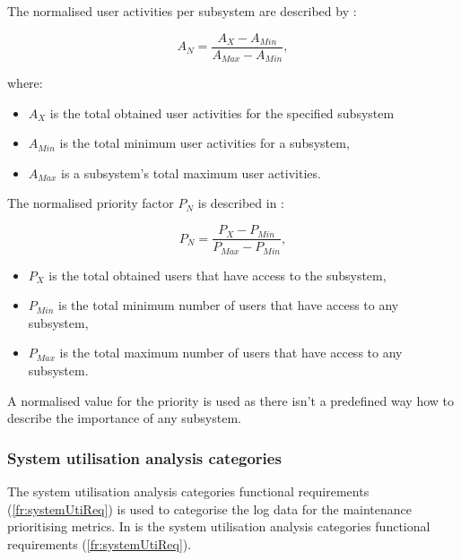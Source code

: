The normalised user activities per subsystem are described by :

\begin{equation}
	\label{eq:ch2_eventNormalised}
	A_{N} = \frac{A_X - A_{Min}}{A_{Max} - A_{Min}},
\end{equation}

where:

\begin{itemize}
	\item $A_X$ is the total obtained user activities for the specified subsystem
	\item $A_{Min}$ is the total minimum user activities for a subsystem,
	\item $A_{Max}$ is a subsystem's total maximum user activities.
\end{itemize}

The normalised priority factor $P_N$ is described in :

\begin{equation}
	\label{eq:ch2_priorityNormalised}
	P_{N} = \frac{P_X - P_{Min}}{P_{Max} - P_{Min}},
\end{equation}

\begin{itemize}
	\item $P_X$ is the total obtained users that have access to the subsystem,
	\item $P_{Min}$ is the total minimum number of users that have access to any subsystem,
	\item $P_{Max}$ is the total maximum number of users that have access to any subsystem.
\end{itemize}

A normalised value for the priority is used as there isn't a predefined way how to describe the importance of any subsystem.

\clearpage

\subsubsection{System utilisation analysis categories}
The system utilisation analysis categories functional requirements (\ref{fr:systemUtiReq}) is used to categorise the log data for the maintenance prioritising metrics. In  is the system utilisation analysis categories functional requirements (\ref{fr:systemUtiReq}).

